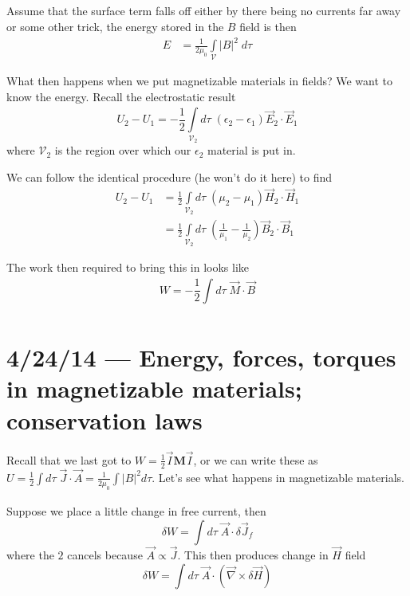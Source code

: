 \documentclass[10pt]{report}
\newcommand{\abs}[1]{\left|#1\right|}
\begin{document}
Assume that the surface term falls off either by there being no currents far away or some other trick, the energy stored in the $B$ field is then
\begin{align}
    E &= \frac{1}{2\mu_0}\int\limits_{\mathcal{V}}^{}\abs{B}^2\;d\tau
\end{align}

What then happens when we put magnetizable materials in fields? We want to know the energy. Recall the electrostatic result
\begin{equation}
    U_2 - U_1 = -\frac{1}{2}\int\limits_{\mathcal{V}_2}^{}d\tau\;(\epsilon_2 - \epsilon_1)\vec{E}_2 \cdot \vec{E}_1
\end{equation}
where $\mathcal{V}_2$ is the region over which our $\epsilon_2$ material is put in. 

We can follow the identical procedure (he won't do it here) to find
\begin{align}
    U_2 - U_1 &= \frac{1}{2}\int\limits_{\mathcal{V}_2}^{}d\tau\;(\mu_2 - \mu_1)\vec{H}_2 \cdot \vec{H}_1\\
    &= \frac{1}{2}\int\limits_{\mathcal{V}_2}^{}d\tau\;\left( \frac{1}{\mu_1} - \frac{1}{\mu_2} \right)\vec{B}_2 \cdot \vec{B}_1
\end{align}

The work then required to bring this in looks like
\begin{equation}
    W = -\frac{1}{2}\int\limits_{}^{}d\tau\;\vec{M} \cdot \vec{B}
\end{equation}
\chapter{4/24/14 --- Energy, forces, torques in magnetizable materials; conservation laws}

Recall that we last got to $W = \frac{1}{2}\vec{I} \mathbf{M} \vec{I}$, or we can write these as $U = \frac{1}{2}\int\limits_{}^{}d\tau\;\vec{J} \cdot \vec{A} = \frac{1}{2\mu_0}\int\abs{B}^2 d\tau$. Let's see what happens in magnetizable materials.

Suppose we place a little change in free current, then 
\begin{equation}
    \delta W = \int d\tau\; \vec{A} \cdot \delta \vec{J}_f
\end{equation}
where the $2$ cancels because $\vec{A} \propto \vec{J}$. This then produces change in $\vec{H}$ field
\begin{equation}
    \delta W = \int d\tau\; \vec{A} \cdot \left( \vec{\nabla} \times \delta \vec{H} \right)
\end{equation}
\end{document}

